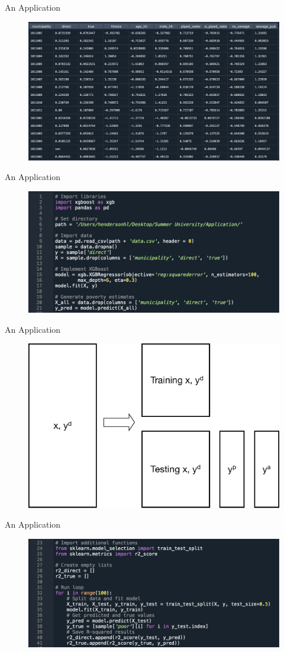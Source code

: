 \documentclass[aspectratio=169, xcolor=dvipsnames]{beamer}
\begin{document}
\begin{frame}{An Application}
\begin{figure}[h!]
  \centering
  \includegraphics[width=0.7 \textwidth]{Data}
\end{figure}
\end{frame}

\begin{frame}{An Application}
\begin{figure}[h!]
  \centering
  \includegraphics[width=0.8 \textwidth]{Code_1}
\end{figure}
\end{frame}

\begin{frame}{An Application}
\begin{figure}[h!]
  \centering
  \includegraphics[width=0.5 \textwidth]{split}
\end{figure}
\end{frame}

\begin{frame}{An Application}
\begin{figure}[h!]
  \centering
  \includegraphics[width=0.8 \textwidth]{Code_2}
\end{figure}
\end{frame}
\end{document}
